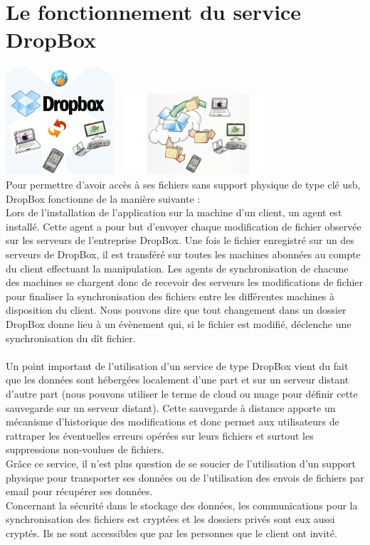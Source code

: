 \documentclass[a4paper, 10pt]{article}
\begin{document}
\section*{Le fonctionnement du service DropBox}
\includegraphics[height = 4cm, width = 4cm]{dropbox_1.png}
\includegraphics[height = 3cm, width = 6cm]{dropbox_3.jpg}\\
Pour permettre d'avoir acc\`es \`a ses fichiers sans support physique de type cl\'e usb, DropBox fonctionne de la mani\`ere suivante :\\
Lors de l'installation de l'application sur la machine d'un client, un agent est install\'e.
Cette agent a pour but d'envoyer chaque modification de fichier observ\'ee sur les serveurs de l'entreprise DropBox.
Une fois le fichier enregistr\'e sur un des serveurs de DropBox, il est transf\'er\'e sur toutes les machines abonn\'ees
au compte du client effectuant la manipulation.
Les agents de synchronisation de chacune des machines se chargent donc de recevoir des serveurs les modifications de fichier pour
finaliser la synchronisation des fichiers entre les diff\'erentes machines \`a disposition du client.
Nous pouvons dire que tout changement dans un dossier DropBox donne lieu \`a un \'ev\`enement qui, si le fichier est modifi\'e,
d\'eclenche une synchronisation du d\^it fichier.\\ \\
Un point important de l'utilisation d'un service de type DropBox vient du fait que les donn\'ees sont h\'eberg\'ees localement d'une part
et sur un serveur distant d'autre part (nous pouvons utiliser le terme de cloud ou nuage pour d\'efinir cette sauvegarde sur un serveur distant).
Cette sauvegarde \`a distance apporte un m\'ecanisme d'historique des modifications et donc
permet aux utilisateurs de rattraper les \'eventuelles erreurs op\'er\'ees sur leurs fichiers et
surtout les suppressions non-voulues de fichiers.\\
Gr\^ace ce service, il n'est plus question de se soucier de l'utilisation d'un support physique pour transporter ses donn\'ees
ou de l'utilisation des envois de fichiers par email pour r\'ecup\'erer ses donn\'ees.\\
Concernant la s\'ecurit\'e dans le stockage des donn\'ees, les communications pour la synchronisation des fichiers est crypt\'ees et
les dossiers priv\'es sont eux aussi crypt\'es. Ils ne sont accessibles que par les personnes que le client ont invit\'e.
\end{document}
